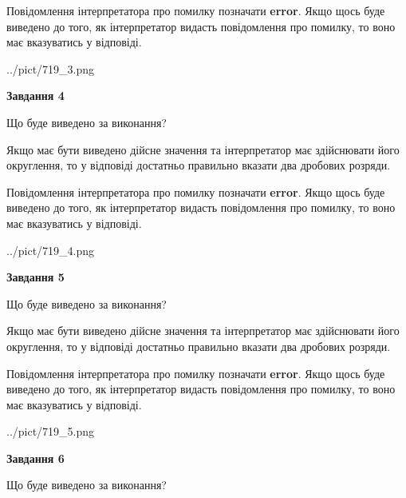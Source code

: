 \documentclass[12pt, ukrainian]{article}
\begin{document}
{\begin {Large}
Повідомлення інтерпретатора про помилку позначати \textbf{error}.
Якщо щось буде виведено до того, як інтерпретатор видасть повідомлення про помилку, 
то воно має вказуватись у відповіді. \par

\begin{center}
	{../pict/719_3.png}
\end{center}
\newpage

{\begin {center}\textbf{Завдання 4}\end {center}}\par
Що буде виведено за виконання? \par

Якщо має бути виведено дійсне значення та інтерпретатор має здійснювати його округлення, 
то у відповіді достатньо правильно вказати два дробових розряди.

Повідомлення інтерпретатора про помилку позначати \textbf{error}.
Якщо щось буде виведено до того, як інтерпретатор видасть повідомлення про помилку, 
то воно має вказуватись у відповіді. \par

\begin{center}
	{../pict/719_4.png}
\end{center}
\newpage

{\begin {center}\textbf{Завдання 5}\end {center}}\par
Що буде виведено за виконання? \par

Якщо має бути виведено дійсне значення та інтерпретатор має здійснювати його округлення, 
то у відповіді достатньо правильно вказати два дробових розряди.

Повідомлення інтерпретатора про помилку позначати \textbf{error}.
Якщо щось буде виведено до того, як інтерпретатор видасть повідомлення про помилку, 
то воно має вказуватись у відповіді. \par

\begin{center}
	{../pict/719_5.png}
\end{center}
\newpage

{\begin {center}\textbf{Завдання 6}\end {center}}\par
Що буде виведено за виконання? \par


\end{Large}}
\end{document}
